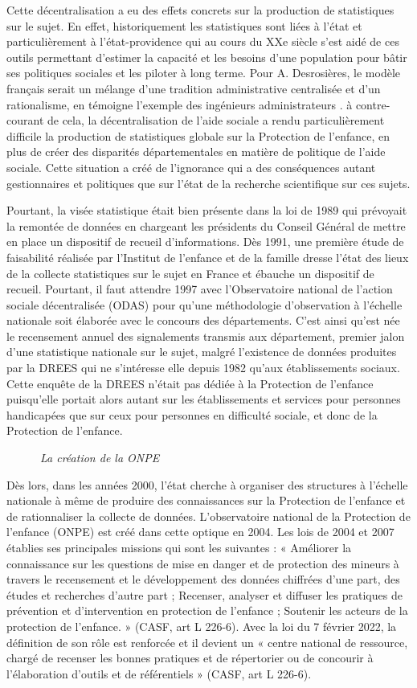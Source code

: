 \documentclass[
  12,
  a4paper,
]{report}
\begin{document}
Cette décentralisation a eu des effets concrets sur la production de
statistiques sur le sujet. En effet, historiquement les statistiques
sont liées à l'état et particulièrement à l'état-providence qui au cours
du XXe siècle s'est aidé de ces outils permettant d'estimer la capacité
et les besoins d'une population pour bâtir ses politiques sociales et
les piloter à long terme. Pour A. Desrosières, le modèle français serait
un mélange d'une tradition administrative centralisée et d'un
rationalisme, en témoigne l'exemple des ingénieurs administrateurs . à
contre-courant de cela, la décentralisation de l'aide sociale a rendu
particulièrement difficile la production de statistiques globale sur la
Protection de l'enfance, en plus de créer des disparités départementales
en matière de politique de l'aide sociale. Cette situation a créé de
l'ignorance qui a des conséquences autant gestionnaires et politiques
que sur l'état de la recherche scientifique sur ces sujets.

Pourtant, la visée statistique était bien présente dans la loi de 1989
qui prévoyait la remontée de données en chargeant les présidents du
Conseil Général de mettre en place un dispositif de recueil
d'informations. Dès 1991, une première étude de faisabilité réalisée par
l'Institut de l'enfance et de la famille dresse l'état des lieux de la
collecte statistiques sur le sujet en France et ébauche un dispositif de
recueil. Pourtant, il faut attendre 1997 avec l'Observatoire national de
l'action sociale décentralisée (ODAS) pour qu'une méthodologie
d'observation à l'échelle nationale soit élaborée avec le concours des
départements. C'est ainsi qu'est née le recensement annuel des
signalements transmis aux département, premier jalon d'une statistique
nationale sur le sujet, malgré l'existence de données produites par la
DREES qui ne s'intéresse elle depuis 1982 qu'aux établissements sociaux.
Cette enquête de la DREES n'était pas dédiée à la Protection de
l'enfance puisqu'elle portait alors autant sur les établissements et
services pour personnes handicapées que sur ceux pour personnes en
difficulté sociale, et donc de la Protection de l'enfance.

~~~~~~\emph{La création de la ONPE}

Dès lors, dans les années 2000, l'état cherche à organiser des
structures à l'échelle nationale à même de produire des connaissances
sur la Protection de l'enfance et de rationnaliser la collecte de
données. L'observatoire national de la Protection de l'enfance (ONPE)
est créé dans cette optique en 2004. Les lois de 2004 et 2007 établies
ses principales missions qui sont les suivantes : « Améliorer la
connaissance sur les questions de mise en danger et de protection des
mineurs à travers le recensement et le développement des données
chiffrées d'une part, des études et recherches d'autre part ; Recenser,
analyser et diffuser les pratiques de prévention et d'intervention en
protection de l'enfance ; Soutenir les acteurs de la protection de
l'enfance. » (CASF, art L 226-6). Avec la loi du 7 février 2022, la
définition de son rôle est renforcée et il devient un « centre national
de ressource, chargé de recenser les bonnes pratiques et de répertorier
ou de concourir à l'élaboration d'outils et de référentiels » (CASF, art
L 226-6).
\end{document}
